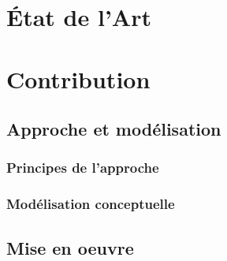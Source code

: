 










\part*{État de l'Art}














\part*{Contribution}

\chapter{Approche et modélisation}\label{chap:mod}
\section{Principes de l'approche}\label{sec:principes}
\section{Modélisation conceptuelle}\label{sec:concept}

\chapter{Mise en oeuvre}\label{chap:op}
